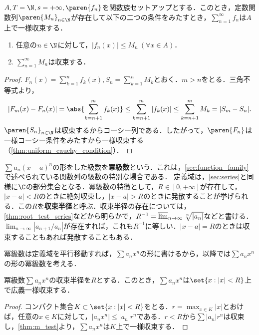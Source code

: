 \documentclass[a4paper,10pt]{ltjsarticle}
\begin{document}
\begin{MyTheorem}
  \(A, T = \N, s = +\infty, \paren{f_n}\)を関数族セットアップとする．このとき，定数関数列\(\paren{M_n}_{n\in\N}\)が存在して以下の二つの条件をみたすとき，\(\sum_{n=1}^\infty f_n\)は\(A\)上で一様収束する．
  \begin{enumerate}
    \item 任意の\(n \in \N\)に対して，\(|f_n(x)| \le M_n \ (\forall x \in A)\)．
    \item \(\sum_{n=1}^\infty M_n\)は収束する．
  \end{enumerate}
\end{MyTheorem}
\begin{proof}
  \(F_n(x) = \sum_{k=1}^n f_k(x), S_n = \sum_{k=1}^n M_k\)とおく．\(m > n\)をとる．三角不等式より，
  \[ |F_m(x) - F_n(x)| = \abs{\sum_{k=n+1}^m f_k(x)} \le \sum_{k=n+1}^m |f_k(x)| \le \sum_{k=n+1}^m M_k = |S_m - S_n|. \]
  \(\paren{S_n}_{n\in\N}\)は収束するからコーシー列である．したがって，\(\paren{F_n}\)は一様コーシー条件をみたすから一様収束する（\cref{thm:uniform_cauchy_condition}）．
\end{proof}

\(\sum a_n (x-a)^n\)の形をした級数を\textbf{冪級数}という．これは，\cref{sec:function_family}で述べられている関数列の級数の特別な場合である．
定義域は，\cref{sec:series}と同様に\(\C\)の部分集合となる．冪級数の特徴として，\(R \in [0, +\infty]\)が存在して，\(|x-a| < R\)のときに絶対収束し，\(|x-a| > R\)のときに発散することが挙げられる．この\(R\)を\textbf{収束半径}と呼ぶ．収束半径の存在については，\cref{thm:root_test_series}などから明らかで，\(R^{-1} = \varlimsup_{n\to\infty} \sqrt[n]{|a_n|}\)などと書ける．\(\lim_{n\to\infty} |a_{n+1}/a_n|\)が存在すれば，これも\(R^{-1}\)に等しい．\(|x-a| = R\)のときは収束することもあれば発散することもある．

冪級数は定義域を平行移動すれば，\(\sum a_n x^n\)の形に書けるから，以降では\(\sum a_n x^n\)の形の冪級数を考える．

\begin{MyTheorem}
  冪級数\(\sum a_n x^n\)の収束半径を\(R\)とする．このとき，\(\sum a_n x^n\)は\(\set{x : |x| < R}\)上で広義一様収束する．
\end{MyTheorem}
\begin{proof}
  コンパクト集合\(K \subset \set{x : |x| < R}\)をとる．\(r = \max_{x \in K} |x|\)とおけば，任意の\(x \in K\)に対して，\(|a_n x^n| \le |a_n| r^n\)である．\(r < R\)から\(\sum |a_n| r^n\)は収束し，\cref{thm:m_test}より，\(\sum a_n x^n\)は\(K\)上で一様収束する．
\end{proof}
\end{document}
